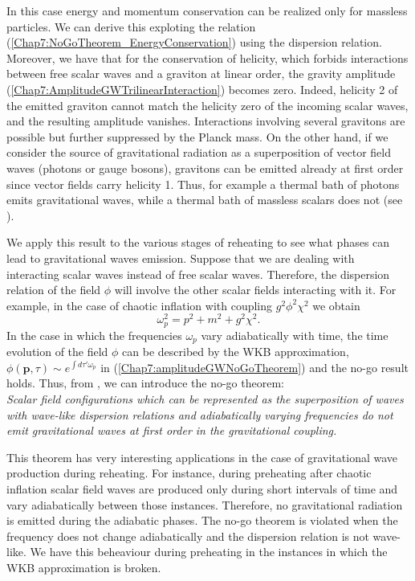 \documentclass[11pt,a4paper,twoside]{book}
\begin{document}
In this case energy and momentum conservation can be realized only for massless particles. We can derive this exploting the relation (\ref{Chap7:NoGoTheorem_EnergyConservation}) using the dispersion relation. Moreover, we have that for the conservation of helicity, which forbids interactions between free scalar waves and a graviton  at linear order, the gravity amplitude (\ref{Chap7:AmplitudeGWTrilinearInteraction}) becomes zero. Indeed, helicity 2 of the emitted graviton cannot match the helicity zero of the incoming scalar waves, and the resulting amplitude vanishes. Interactions involving several gravitons are possible but further suppressed by the Planck mass. On the other hand, if we consider the source of gravitational radiation as a superposition of vector field waves (photons or gauge bosons), gravitons can be emitted already at first order  since  vector fields carry helicity 1. Thus, for example a thermal bath of photons emits gravitational waves, while a thermal bath of massless scalars does not (see \cite{Chap7:GreenMethod}).

We apply this result to the various stages of reheating to see what phases can lead to gravitational waves emission. Suppose that we are dealing with interacting scalar waves instead of free scalar waves. Therefore, the dispersion relation of the field $\phi$ will involve the other scalar fields interacting with it. For example, in the case of chaotic inflation with coupling $ g^{2}\phi^{2}\chi^{2} $ we obtain
\begin{equation}
\label{Chap7:dispersionRelationWithCoupling}
\omega_{p}^{2}=p^{2}+m^{2}+g^{2}\chi^{2}.
\end{equation}
In the case in which the frequencies $\omega_{p}$ vary adiabatically with time, the time evolution of the  field $\phi$ can be described by the WKB approximation, $ \phi(\textbf{p},\tau) \sim e^{\int d\tau' \omega_{p}} $ in (\ref{Chap7:amplitudeGWNoGoTheorem}) and the no-go result holds. Thus, from \cite{Chap7:GreenMethod}, we can introduce the no-go theorem:\\
\textit{Scalar field configurations which can be represented  as the superposition of waves with wave-like dispersion relations and adiabatically varying frequencies do not emit gravitational waves at first order in the gravitational coupling.}

This theorem has very interesting applications in the case of gravitational wave production during reheating. For instance, during preheating after chaotic inflation scalar field waves are produced only during short intervals of time and vary adiabatically between those instances. Therefore, no gravitational radiation is emitted during the adiabatic phases. The no-go theorem is violated when the frequency does not change adiabatically and the dispersion relation is not wave-like. We have this beheaviour during preheating in the instances in which the WKB approximation is broken.
\end{document}
